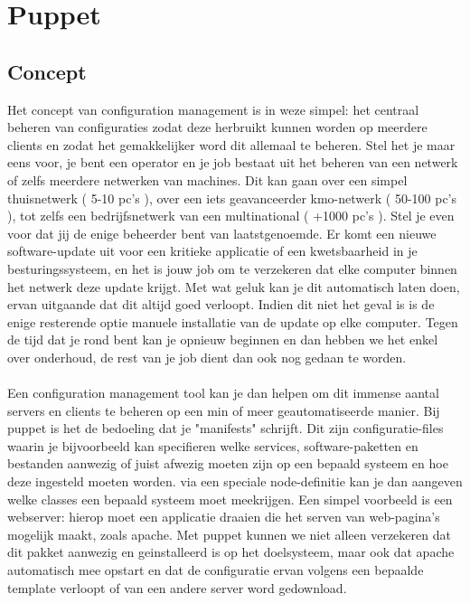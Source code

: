 \chapter{Puppet}

\section{Concept}
Het concept van configuration management is in weze simpel: het centraal beheren van configuraties zodat deze herbruikt kunnen worden op meerdere clients en zodat het gemakkelijker word dit allemaal te beheren. Stel het je maar eens voor, je bent een operator en je job bestaat uit het beheren van een netwerk of zelfs meerdere netwerken van machines. Dit kan gaan over een simpel thuisnetwerk ( 5-10 pc's ), over een iets geavanceerder kmo-netwerk ( 50-100 pc's ), tot zelfs een bedrijfsnetwerk van een multinational ( +1000 pc's ). Stel je even voor dat jij de enige beheerder bent van laatstgenoemde. Er komt een nieuwe software-update uit voor een kritieke applicatie of een kwetsbaarheid in je besturingssysteem, en het is jouw job om te verzekeren dat elke computer binnen het netwerk deze update krijgt. Met wat geluk kan je dit automatisch laten doen, ervan uitgaande dat dit altijd goed verloopt. Indien dit niet het geval is is de enige resterende optie manuele installatie van de update op elke computer. Tegen de tijd dat je rond bent kan je opnieuw beginnen en dan hebben we het enkel over onderhoud, de rest van je job dient dan ook nog gedaan te worden.\\\\
Een configuration management tool kan je dan helpen om dit immense aantal servers en clients te beheren op een min of meer geautomatiseerde manier. Bij puppet is het de bedoeling dat je "manifests" schrijft. Dit zijn configuratie-files waarin je bijvoorbeeld kan specifieren welke services, software-paketten en bestanden aanwezig of juist afwezig moeten zijn op een bepaald systeem en hoe deze ingesteld moeten worden. via een speciale node-definitie kan je dan aangeven welke classes een bepaald systeem moet meekrijgen. Een simpel voorbeeld is een webserver: hierop moet een applicatie draaien die het serven van web-pagina's mogelijk maakt, zoals apache. Met puppet kunnen we niet alleen verzekeren dat dit pakket aanwezig en geinstalleerd is op het doelsysteem, maar ook dat apache automatisch mee opstart en dat de configuratie ervan volgens een bepaalde template verloopt of van een andere server word gedownload.\\\\
